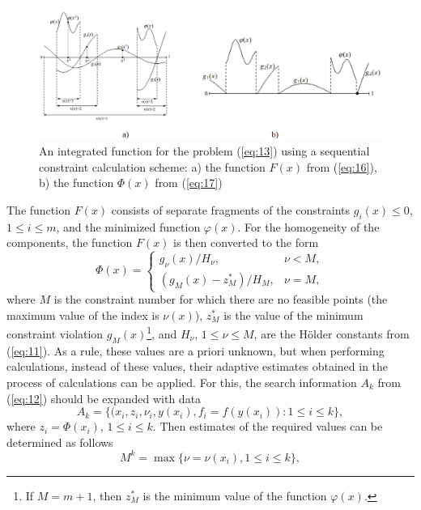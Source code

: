 \documentclass[smallextended]{svjour3}       %
\begin{document}
\begin{figure}
  \centering
  \includegraphics[width=\linewidth]{fig1}
  \caption{An integrated function for the problem (\ref{eq:13}) using a sequential constraint calculation scheme: a) the function $F(x)$ from (\ref{eq:16}), b) the function $\Phi(x)$ from (\ref{eq:17})}
  \label{fig:1}
\end{figure}

The function $F(x)$ consists of separate fragments of the constraints $g_i(x) \leq 0$, $1 \leq i \leq m$, and the minimized function $\varphi(x)$. For the homogeneity of the components, the function $F(x)$ is then converted to the form 
\begin{equation}\label{eq:17}
\Phi (x) = 
 \begin{cases}
   g_\nu(x) / H_\nu, & \nu < M, \\
   (g_M(x)-z^*_M) / H_M, & \nu = M,
 \end{cases}
\end{equation}
where $M$ is the constraint number for which there are no feasible points (the maximum value of the index is $\nu(x)$), $z^*_M$ is the value of the minimum constraint violation $g_M(x)$\footnote{If $M=m+1$, then $z_M^*$ is the minimum value of the function $\varphi(x)$.}, and $H_\nu$, $1\leq \nu \leq M$, are the H\"older constants from (\ref{eq:11}). As a rule, these values are a priori unknown, but when performing calculations, instead of these values, their adaptive estimates obtained in the process of calculations can be applied. For this, the search information $A_k$ from (\ref{eq:12}) should be expanded with data
\begin{equation}\label{eq:18}
A_k=\{(x_i, z_i, \nu_i, y(x_i), f_i=f( y(x_i)): 1 \leq i \leq k \},
\end{equation}
where $z_i= \Phi(x_i)$, $1 \leq i \leq k$. Then estimates of the required values can be determined as follows
\begin{equation}\label{eq:19}
M^k= \max{\{\nu=\nu(x_i), 1\leq i \leq k \}},
\end{equation}
\end{document}

